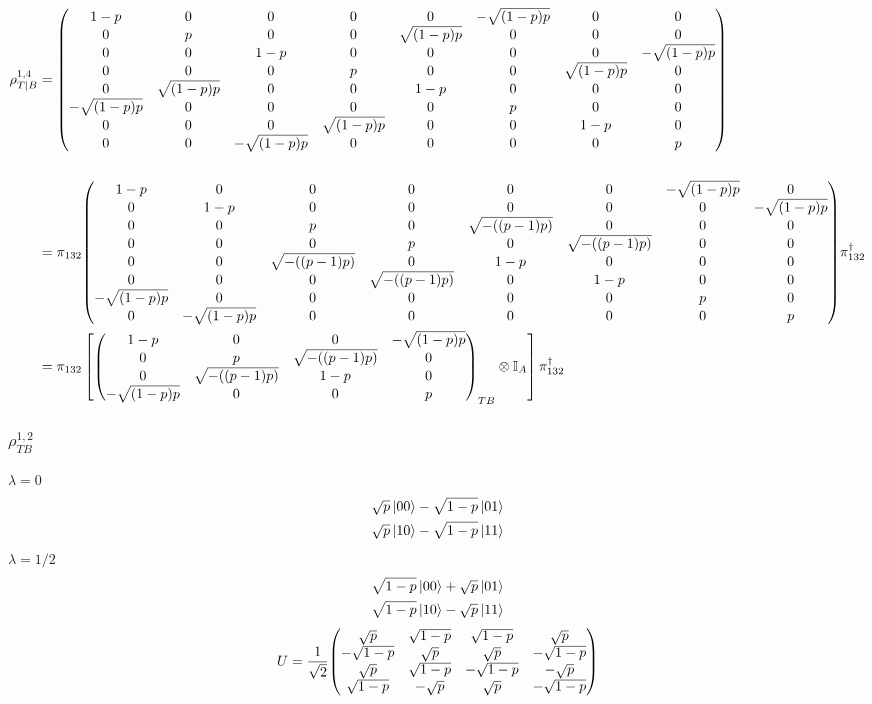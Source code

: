 \documentclass[12pt]{article}
\begin{document}
{\scriptsize
\begin{align*}
    \rho_{T|B}^{1,4} &= \mqty(
    1-p & 0 & 0 & 0 & 0 & -\sqrt{(1-p) p} & 0 & 0 \\
    0 & p & 0 & 0 & \sqrt{(1-p)p} & 0 & 0 & 0 \\
    0 & 0 & 1-p & 0 & 0 & 0 & 0 & -\sqrt{(1-p) p} \\
    0 & 0 & 0 & p & 0 & 0 & \sqrt{(1-p)p} & 0 \\
    0 & \sqrt{(1-p)p} & 0 & 0 & 1-p & 0 & 0 & 0 \\
    -\sqrt{(1-p) p} & 0 & 0 & 0 & 0 & p & 0 & 0 \\
    0 & 0 & 0 & \sqrt{(1-p)p} & 0 & 0 & 1-p & 0 \\
    0 & 0 & -\sqrt{(1-p) p} & 0 & 0 & 0 & 0 & p
) \\
\\
&= \pi_{132}\mqty(1-p&0&0&0&0&0&-\sqrt{(1-p)p}&0\\0&1-p&0&0&0&0&0&-\sqrt{(1-p)p}\\0&0&p&0&\sqrt{-((p-1)p)}&0&0&0\\0&0&0&p&0&\sqrt{-((p-1)p)}&0&0\\0&0&\sqrt{-((p-1)p)}&0&1-p&0&0&0\\0&0&0&\sqrt{-((p-1)p)}&0&1-p&0&0\\-\sqrt{(1-p)p}&0&0&0&0&0&p&0\\0&-\sqrt{(1-p)p}&0&0&0&0&0&p)\pi_{132}^\dag \\
&= \pi_{132}\left[\mqty(1-p&0&0&-\sqrt{(1-p)p}\\0&p&\sqrt{-((p-1)p)}&0\\0&\sqrt{-((p-1)p)}&1-p&0\\-\sqrt{(1-p)p}&0&0&p)_{TB}\otimes\mathbb{I}_A\right] \pi_{132}^\dag
\end{align*}
}

\subsubsection*{$\rho_{TB}^{1,2}$}
$\lambda = 0$
\begin{align*}
    \sqrt{p}\ket{00} - \sqrt{1-p}\ket{01} \\
    \sqrt{p}\ket{10} - \sqrt{1-p}\ket{11} 
\end{align*}
$\lambda = 1/2$
\begin{align*}
    \sqrt{1-p}\ket{00} + \sqrt{p}\ket{01} \\
    \sqrt{1-p}\ket{10} - \sqrt{p}\ket{11}
\end{align*}
\[ U = \frac{1}{\sqrt{2}}\mqty(\sqrt{p}&\sqrt{1-p}&\sqrt{1-p}&\sqrt{p}\\-\sqrt{1-p}&\sqrt{p}&\sqrt{p}&-\sqrt{1-p}\\\sqrt{p}&\sqrt{1-p}&-\sqrt{1-p}&-\sqrt{p}\\\sqrt{1-p}&-\sqrt{p}&\sqrt{p}&-\sqrt{1-p}) \]
\end{document}
